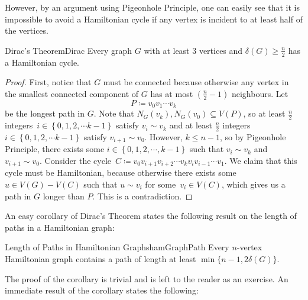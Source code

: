 \documentclass[math]{amznotes}
\theoremstyle{remark}
\newcommand{\0}{\mathbf{0}}
\newcommand{\1}{\mathbf{1}}
\begin{document}
However, by an argument using Pigeonhole Principle, one can easily see that it is impossible to avoid a Hamiltonian cycle if any vertex is incident to at least half of the vertices.
\begin{thmbox}{Dirac's Theorem}{Dirac}
    Every graph $G$ with at least $3$ vertices and $\delta(G) \geq \frac{n}{2}$ has a Hamiltonian cycle.
    \tcblower
    \begin{proof}
        First, notice that $G$ must be connected because otherwise any vertex in the smallest connected component of $G$ has at most $\left(\frac{n}{2} - 1\right)$ neighbours. Let 
        \begin{equation*}
            P \coloneqq v_0v_1\cdots v_k
        \end{equation*}
        be the longest path in $G$. Note that $N_G(v_k), N_G(v_0) \subseteq V(P)$, so at least $\frac{n}{2}$ integers~$i \in \left\{0, 1, 2, \cdots k - 1\right\}$ satisfy $v_i \sim v_k$ and at least $\frac{n}{2}$ integers $i \in \left\{0, 1, 2, \cdots k - 1\right\}$ satisfy $v_{i + 1} \sim v_0$. However, $k \leq n - 1$, so by Pigeonhole Principle, there exists some $i \in \left\{0, 1, 2, \cdots, k - 1\right\}$ such that $v_i \sim v_k$ and $v_{i + 1} \sim v_0$. Consider the cycle~$C \coloneqq v_0v_{i + 1}v_{i + 2}\cdots v_kv_iv_{i - 1}\cdots v_1$. We claim that this cycle must be Hamiltonian, because otherwise there exists some $u \in V(G) - V(C)$ such that $u \sim v_i$ for some~$v_i \in V(C)$, which gives us a path in $G$ longer than $P$. This is a contradiction.
    \end{proof}
\end{thmbox}
An easy corollary of Dirac's Theorem states the following result on the length of paths in a Hamiltonian graph:
\begin{corbox}{Length of Paths in Hamiltonian Graphs}{hamGraphPath}
    Every $n$-vertex Hamiltonian graph contains a path of length at least $\min\{n - 1, 2\delta(G)\}$.
\end{corbox}
The proof of the corollary is trivial and is left to the reader as an exercise. An immediate result of the corollary states the following:
\end{document}
